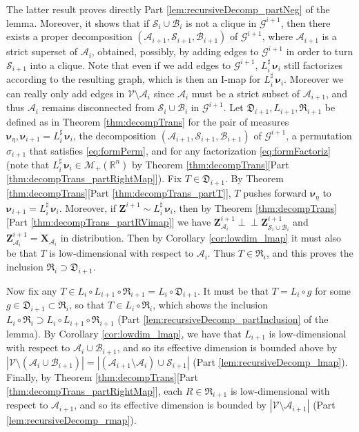 \documentclass[twoside,11pt]{article}
\newcommand{\orth}{ \perp\!\!\!\perp }  %
\newcommand{\borelm}{\mathscr{M}}
\newcommand{\borelmp}{\borelm_+}
\newcommand{\genm}{\boldsymbol{\nu} }   %
\newcommand{\re}{\mathbb{R}}
\newcommand{\Bc}{\mathcal{B}}
\newcommand{\Vc}{\mathcal{V}}
\newcommand{\Ac}{\mathcal{A}}
\newcommand{\Sc}{\mathcal{S}}
\newcommand{\Xb}{\boldsymbol{X}}
\newcommand{\Zb}{\boldsymbol{Z}}
\newcommand{\Gcb}{\boldsymbol{\mathcal{G}}}
\newcommand{\lmap}{L} %
\newcommand{\decset}{\mathfrak{D}} %
\newcommand{\Aset}{ \Ac }
\newcommand{\Bset}{ \Bc }
\newcommand{\Sset}{ \Sc }
\newcommand{\pull}{^\sharp}
\begin{document}
The latter result proves directly Part \ref{lem:recursiveDecomp_partNeg} of the lemma.
%
%
Moreover, it shows that if
$\Sset_i \cup \Bset_i$ is not a clique in $\Gcb^{i+1}$, then
%
%
there exists a proper decomposition $(\Aset_{i+1},\Sset_{i+1},\Bset_{i+1})$
of $\Gcb^{i+1}$, 
where $\Aset_{i+1}$ is a strict superset of $\Aset_i$,
obtained, possibly, by adding edges to $\Gcb^{i+1}$ in order
to turn $\Sset_{i+1}$ into a clique. 
Note that even if we add edges to $\Gcb^{i+1}$, 
$\lmap_i\pull \,\genm_i$ still factorizes according to the resulting
graph, which is then an I-map for  $\lmap_i\pull \,\genm_i$.
%
Moreover we can really only add edges in $\Vc \setminus \Aset_i$ since
$\Aset_i$ must be a strict subset of $\Aset_{i+1}$, and thus
$\Aset_i$ remains disconnected from $\Sset_i \cup \Bset_i$ in 
$\Gcb^{i+1}$.
Let $\decset_{i+1},\lmap_{i+1},\mathfrak{R}_{i+1}$ be defined as in 
Theorem \ref{thm:decompTrans} 
for the pair of measures $\genm_\eta , \genm_{i+1} = \lmap_i\pull \,\genm_i$, the
decomposition $(\Aset_{i+1},\Sset_{i+1},\Bset_{i+1})$ of $\Gcb^{i+1}$, 
a permutation  $\sigma_{i+1}$ that satisfies \eqref{eq:formPerm}, and for any
factorization \eqref{eq:formFactoriz} %
(note that $\lmap_i\pull \,\genm_i \in \borelmp(\re^n)$ 
by Theorem \ref{thm:decompTrans}[Part \ref{thm:decompTrans_partRightMap}]).
%
Fix $T\in \decset_{i+1}$.
By Theorem \ref{thm:decompTrans}[Part \ref{thm:decompTrans_partT}], 
$T$ pushes
forward $\genm_\eta$ to $\genm_{i+1} = \lmap_i\pull \,\genm_i$.
Moreover, if $\Zb^{i+1} \sim \lmap_i\pull \,\genm_i$, then by 
Theorem \ref{thm:decompTrans}[Part \ref{thm:decompTrans_partRVimap}]
we have
$\Zb^{i+1}_{\Aset_i} \orth \Zb^{i+1}_{\Sset_i \cup \Bset_i}$ and 
$\Zb^{i+1}_{\Aset_i} = \Xb_{\Aset_i}$ in distribution.
%
Then by Corollary \ref{cor:lowdim_lmap}
%
%
%
%
%
it must also be that $T$
is  low-dimensional with respect to $\Aset_i$.
%
%
Thus $T \in \mathfrak{R}_i$, and this proves the inclusion 
$\mathfrak{R}_i \supset \decset_{i+1}$.

Now fix
any $T \in \lmap_i \circ \lmap_{i+1} \circ \mathfrak{R}_{i+1} 
= \lmap_i \circ \decset_{i+1}$. 
It must be that $T = \lmap_i \circ g$ for some $g \in \decset_{i+1} \subset \mathfrak{R}_i$,
so that $T \in \lmap_i \circ \mathfrak{R}_i$, which shows the inclusion
$\lmap_i \circ \mathfrak{R}_i \supset 
\lmap_i \circ \lmap_{i+1} \circ \mathfrak{R}_{i+1}$
(Part \ref{lem:recursiveDecomp_partInclusion} of the lemma).
%
By Corollary \ref{cor:lowdim_lmap},
%
%
we have that
$\lmap_{i+1}$ is low-dimensional with respect to $\Aset_i \cup \Bset_{i+1}$, and so
its effective dimension is  bounded above by
$|\Vc \setminus (\Aset_i \cup \Bset_{i+1})|=|(\Aset_{i+1} \setminus \Aset_{i}) \cup \Sset_{i+1}|$
(Part \ref{lem:recursiveDecomp_lmap}).
%
Finally, by Theorem \ref{thm:decompTrans}[Part \ref{thm:decompTrans_partRightMap}],
each $R \in \mathfrak{R}_{i+1}$ is low-dimensional with respect to 
$\Aset_{i+1}$, and so its effective dimension is bounded by 
$|\Vc \setminus \Ac_{i+1}|$
(Part \ref{lem:recursiveDecomp_rmap}).
%
%
%
%
%
%
\hfill\BlackBox\\[2mm]
\end{document}
